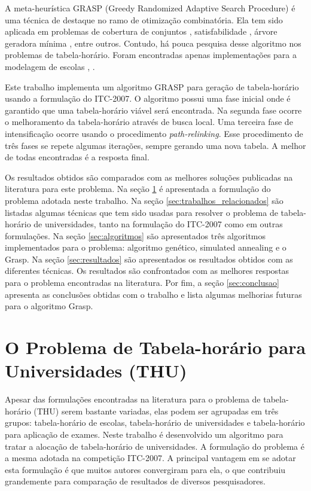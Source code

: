 \documentclass[11pt]{article}
\begin{document}
A meta-heurística GRASP (Greedy Randomized Adaptive Search Procedure) é uma técnica de destaque no ramo de otimização combinatória. Ela tem sido aplicada em problemas de cobertura de conjuntos \cite{Res98}, satisfabilidade \cite{FesParPitRes06a}, árvore geradora mínima \cite{Souza02agrasp}, entre outros. Contudo, há pouca pesquisa desse algoritmo nos problemas de tabela-horário. Foram encontradas apenas implementações para a modelagem de escolas \cite{Souza:2004}, \cite{Vieira_agrasp}.

Este trabalho implementa um algoritmo GRASP para geração de tabela-horário usando a formulação do ITC-2007. O algoritmo possui uma fase inicial onde é garantido que uma tabela-horário viável será encontrada. Na segunda fase ocorre o melhoramento da tabela-horário através de busca local. Uma terceira fase de intensificação ocorre usando o procedimento \textit{path-relinking}. Esse procedimento de três fases se repete algumas iterações, sempre gerando uma nova tabela. A melhor de todas encontradas é a resposta final.

Os resultados obtidos são comparados com as melhores soluções publicadas na literatura para este problema. Na seção \ref{sec:problema} é apresentada a formulação do problema adotada neste trabalho. Na seção \ref{sec:trabalhos_relacionados} são listadas algumas técnicas que tem sido usadas para resolver o problema de tabela-horário de universidades, tanto na formulação do ITC-2007 como em outras formulações. Na seção \ref{sec:algoritmos} são apresentados três algoritmos implementados para o problema: algoritmo genético, simulated annealing e o Grasp. Na seção \ref{sec:resultados} são apresentados os resultados obtidos com as diferentes técnicas. Os resultados são confrontados com as melhores respostas para o problema encontradas na literatura. Por fim, a seção \ref{sec:conclusao} apresenta as conclusões obtidas com o trabalho e lista algumas melhorias futuras para o algoritmo Grasp.

\section{O Problema de Tabela-horário para Universidades (THU)}
\label{sec:problema}

Apesar das formulações encontradas na literatura para o problema de tabela-horário (THU) serem bastante variadas, elas podem ser agrupadas em três grupos: tabela-horário de escolas, tabela-horário de universidades e tabela-horário para aplicação de exames. Neste trabalho é desenvolvido um algoritmo para tratar a alocação de tabela-horário de universidades. A formulação do problema é a mesma adotada na competição ITC-2007. A principal vantagem em se adotar esta formulação é que muitos autores convergiram para ela, o que contribuiu grandemente para comparação de resultados de diversos pesquisadores.
\end{document}
